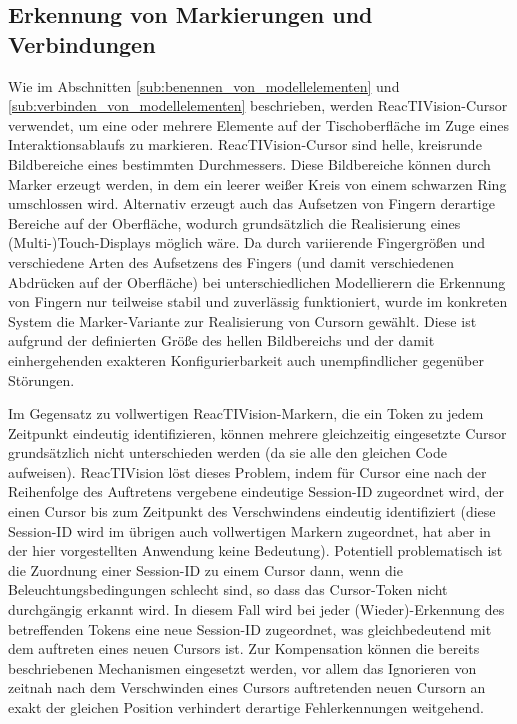 
\subsection{Erkennung von Markierungen und Verbindungen} %
\label{sub:erkennen_von_verbindungen}

Wie im Abschnitten \ref{sub:benennen_von_modellelementen} und \ref{sub:verbinden_von_modellelementen} beschrieben, werden ReacTIVision-Cursor verwendet, um eine oder mehrere Elemente auf der Tischoberfläche im Zuge eines Interaktionsablaufs zu markieren. ReacTIVision-Cursor sind helle, kreisrunde Bildbereiche eines bestimmten Durchmessers. Diese Bildbereiche können durch Marker erzeugt werden, in dem ein leerer weißer Kreis von einem schwarzen Ring umschlossen wird. Alternativ erzeugt auch das Aufsetzen von Fingern derartige Bereiche auf der Oberfläche, wodurch grundsätzlich die Realisierung eines (Multi-)Touch-Displays möglich wäre. Da durch variierende Fingergrößen und verschiedene Arten des Aufsetzens des Fingers (und damit verschiedenen Abdrücken auf der Oberfläche) bei unterschiedlichen Modellierern die Erkennung von Fingern nur teilweise stabil und zuverlässig funktioniert, wurde im konkreten System die Marker-Variante zur Realisierung von Cursorn gewählt. Diese ist aufgrund der definierten Größe des hellen Bildbereichs und der damit einhergehenden exakteren Konfigurierbarkeit auch unempfindlicher gegenüber Störungen.

Im Gegensatz zu vollwertigen ReacTIVision-Markern, die ein Token zu jedem Zeitpunkt eindeutig identifizieren, können mehrere gleichzeitig eingesetzte Cursor grundsätzlich nicht unterschieden werden (da sie alle den gleichen Code aufweisen). ReacTIVision löst dieses Problem, indem für Cursor eine nach der Reihenfolge des Auftretens vergebene eindeutige Session-ID zugeordnet wird, der einen Cursor bis zum Zeitpunkt des Verschwindens eindeutig identifiziert (diese Session-ID wird im übrigen auch vollwertigen Markern zugeordnet, hat aber in der hier vorgestellten Anwendung keine Bedeutung). Potentiell problematisch ist die Zuordnung einer Session-ID zu einem Cursor dann, wenn die Beleuchtungsbedingungen schlecht sind, so dass das Cursor-Token nicht durchgängig erkannt wird. In diesem Fall wird bei jeder (Wieder)-Erkennung des betreffenden Tokens eine neue Session-ID zugeordnet, was gleichbedeutend mit dem auftreten eines neuen Cursors ist. Zur Kompensation können die bereits beschriebenen Mechanismen eingesetzt werden, vor allem das Ignorieren von zeitnah nach dem Verschwinden eines Cursors auftretenden neuen Cursorn an exakt der gleichen Position verhindert derartige Fehlerkennungen weitgehend.

